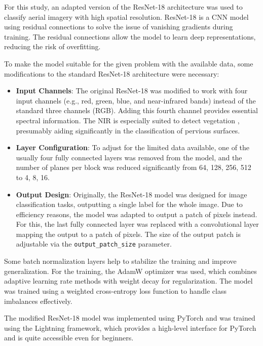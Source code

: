 For this study, an adapted version of the ResNet-18 architecture was used to classify 
aerial imagery with high spatial resolution. ResNet-18 is a CNN model 
using residual connections to solve the issue of vanishing
gradients during training. The residual connections allow the model to learn
deep representations, reducing the risk of overfitting.

To make the model suitable for the given problem with the available data, some 
modifications to the standard ResNet-18 architecture were necessary:

\begin{itemize}
    \item \textbf{Input Channels}: The original ResNet-18 was modified to work with four input 
    channels (e.g., red, green, blue, and near-infrared bands) instead of the standard
    three channels (RGB). Adding this fourth channel provides essential spectral
    information. The NIR is especially suited to detect vegetation \autocite{rouseMonitoringVegetationSystems1974}, 
    presumably aiding significantly in the classification of pervious surfaces.

    \item \textbf{Layer Configuration}: To adjust for the limited data available, one
    of the usually four fully connected layers was removed from the model, and the
    number of planes per block was reduced significantly from 64, 128, 256, 512 to 4, 8, 16.

    \item \textbf{Output Design}: Originally, the ResNet-18 model was designed for image
    classification tasks, outputting a single label for the whole image. Due to
    efficiency reasons, the model was adapted to output a patch of pixels instead.
    For this, the last fully connected layer was replaced with a convolutional layer
    mapping the output to a patch of pixels. The size of the output patch is adjustable
    via the \texttt{output\_patch\_size} parameter.
\end{itemize}    

Some batch normalization layers help to stabilize the training and improve generalization.
For the training, the AdamW optimizer was used, which combines adaptive learning
rate methods with weight decay for regularization. The model was trained using
a weighted cross-entropy loss function to handle class imbalances effectively.

The modified ResNet-18 model was implemented using PyTorch and was trained using 
the Lightning framework, which provides a high-level interface for PyTorch
and is quite accessible even for beginners.

